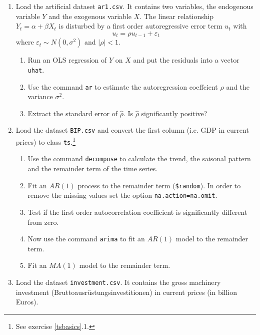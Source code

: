 \documentclass{article}
\begin{document}
\begin{enumerate}
\item Load the artificial dataset \texttt{ar1.csv}. It contains two
variables, the endogenous variable $Y$ and the exogenous variable $X$. The
linear relationship $Y_{t}=\alpha +\beta X_{t}$ is disturbed by a first
order autoregressive error term $u_{t}$ with%
\begin{equation*}
u_{t}=\rho u_{t-1}+\varepsilon _{t}
\end{equation*}%
where $\varepsilon _{t}\sim N(0,\sigma ^{2})$ and $|\rho |<1$.

\begin{enumerate}
\item Run an OLS regression of $Y$ on $X$ and put the residuals into a
vector \texttt{uhat}.

\item Use the command \texttt{ar} to estimate the autoregression coeffcient $%
\rho $ and the variance $\sigma ^{2}$.

\item Extract the standard error of $\hat{\rho}$. Is $\hat{\rho}$
significantly positive?
\end{enumerate}

\item Load the dataset \texttt{BIP.csv} and convert the first column (i.e.
GDP in current prices) to class \texttt{ts}.\footnote{%
See exercise \ref{tsbasics}.1.}

\begin{enumerate}
\item Use the command \texttt{decompose} to calculate the trend, the
saisonal pattern and the remainder term of the time series.

\item Fit an $AR(1)$ process to the remainder term (\texttt{\$random}). In
order to remove the missing values set the option \texttt{na.action=na.omit}.

\item Test if the first order autocorrelation coefficient is significantly
different from zero.

\item Now use the command \texttt{arima} to fit an $AR(1)$ model to the
remainder term.

\item Fit an $MA(1)$ model to the remainder term.
\end{enumerate}

\item Load the dataset \texttt{investment.csv}. It contains the gross
machinery investment (Bruttoausr\"{u}stungsinvestitionen) in current prices
(in billion Euros).


\end{enumerate}
\end{document}

